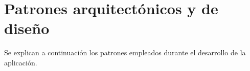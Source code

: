 \section{Patrones arquitectónicos y de diseño}

Se explican a continuación los patrones empleados durante el desarrollo de la aplicación.










